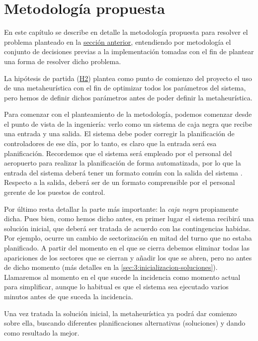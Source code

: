 \graphicspath{{capitulos/Capitulo3-Metodologia-propuesta/recursos/}}

\section{Metodología propuesta} \label{capitulo:3}
En este capítulo se describe en detalle la metodología propuesta para resolver el problema planteado en la \hyperref[capitulo:2]{sección anterior}, entendiendo por metodología el conjunto de decisiones previas a la implementación tomadas con el fin de plantear una forma de resolver dicho problema.

La hipótesis de partida (\hyperref[H2]{H2}) plantea como punto de comienzo del proyecto el uso de una metaheurística con el fin de optimizar todos los parámetros del sistema, pero hemos de definir dichos parámetros antes de poder definir la metaheurística.

Para comenzar con el planteamiento de la metodología, podemos comenzar desde el punto de vista de la ingeniería: verlo como un sistema de caja negra que recibe una entrada y una salida.
El sistema debe poder corregir la planificación de controladores de ese día, por lo tanto, es claro que la entrada será esa planificación. Recordemos que el sistema \legacy{} será empleado por el personal del aeropuerto para realizar la planificación de forma automatizada, por lo que la entrada del sistema deberá tener un formato común con la salida del sistema \legacy{}.
Respecto a la salida, deberá ser de un formato comprensible por el personal gerente de los puestos de control.

Por último resta detallar la parte más importante: la \textit{caja negra} propiamente dicha. Pues bien, como hemos dicho antes, en primer lugar el sistema recibirá una solución inicial, que deberá ser tratada de acuerdo con las contingencias habidas. Por ejemplo, ocurre un cambio de sectorización en mitad del turno que no estaba planificado. 
A partir del momento en el que se cierra debemos eliminar todas las apariciones de los sectores que se cierran y añadir los que se abren, pero no antes de dicho momento (más detalles en la \autoref{sec:3:inicializacion-soluciones}). 
Llamaremos al momento en el que sucede la incidencia como momento actual para simplificar, aunque lo habitual es que el sistema sea ejecutado varios minutos antes de que suceda la incidencia.

Una vez tratada la solución inicial, la metaheurística ya podrá dar comienzo sobre ella, buscando diferentes 
planificaciones alternativas (soluciones) y dando como resultado la mejor. 

